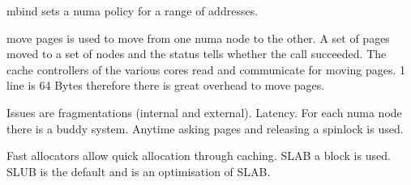 \documentclass[twoside]{article}
\begin{document}
mbind sets a numa policy for a range of addresses.

move pages is used to move from one numa node to the other. A set of pages moved to a set of nodes and the status tells whether the call succeeded. The cache controllers of the various cores read and communicate for moving pages. 1 line is 64 Bytes therefore there is great overhead to move pages.

Issues are fragmentations (internal and external). Latency. For each numa node there is a buddy system. Anytime asking pages and releasing a spinlock is used.

Fast allocators allow quick allocation through caching. SLAB a block is used. SLUB is the default and is an optimisation of SLAB.

\newpage


\end{document}
